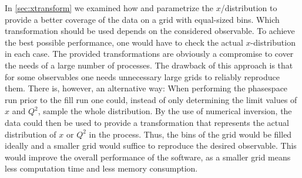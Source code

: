 In \cref{sec:xtransform} we examined how \appl{} and \fnlo{} parametrize the $x$\-/distribution to provide a better coverage of the data on a grid with equal-sized bins.
Which transformation should be used depends on the considered observable.
To achieve the best possible performance, one would have to check the actual $x$-distribution in each case.
The provided transformations are obviously a compromise to cover the needs of a large number of processes.
The drawback of this approach is that for some observables one needs unnecessary large grids to reliably reproduce them.
There is, however, an alternative way: When performing the phasespace run prior to the fill run one could, instead of only determining the limit values of $x$ and $Q^2$, sample the whole distribution.
By the use of numerical inversion, the data could then be used to provide a transformation that represents the actual distribution of $x$ or $Q^2$ in the process.
Thus, the bins of the grid would be filled ideally and a smaller grid would suffice to reproduce the desired observable.
This would improve the overall performance of the software, as a smaller grid means less computation time and less memory consumption.

